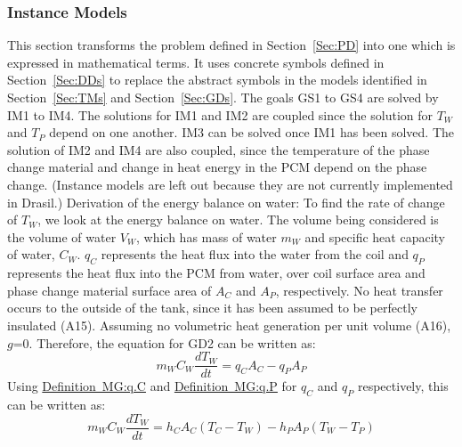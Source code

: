 \documentclass[12pt]{article}
\begin{document}
\subsubsection{Instance Models}
\label{Sec:IMs}
This section transforms the problem defined in Section~\ref{Sec:PD} into one which is expressed in mathematical terms. It uses concrete symbols defined in Section~\ref{Sec:DDs} to replace the abstract symbols in the models identified in Section~\ref{Sec:TMs} and Section~\ref{Sec:GDs}.
The goals GS1 to GS4 are solved by IM1 to IM4. The solutions for IM1 and IM2 are coupled since the solution for $T_{W}$ and $T_{P}$ depend on one another. IM3 can be solved once IM1 has been solved. The solution of IM2 and IM4 are also coupled, since the temperature of the phase change material and change in heat energy in the PCM depend on the phase change. (Instance models are left out because they are not currently implemented in Drasil.)
Derivation of the energy balance on water:
To find the rate of change of $T_{W}$, we look at the energy balance on water. The volume being considered is the volume of water $V_{W}$, which has mass of water $m_{W}$ and specific heat capacity of water, $C_{W}$. $q_{C}$ represents the heat flux into the water from the coil and $q_{P}$ represents the heat flux into the PCM from water, over coil surface area and phase change material surface area of $A_{C}$ and $A_{P}$, respectively. No heat transfer occurs to the outside of the tank, since it has been assumed to be perfectly insulated (A15). Assuming no volumetric heat generation per unit volume (A16), $g$=0. Therefore, the equation for GD2 can be written as:
\begin{equation}
m_{W}C_{W}\frac{dT_{W}}{dt}=q_{C}A_{C}-q_{P}A_{P}
\end{equation}
Using \hyperref[MG:q.C]{Definition~MG:q.C} and \hyperref[MG:q.P]{Definition~MG:q.P} for $q_{C}$ and $q_{P}$ respectively, this can be written as:
\begin{equation}
m_{W}C_{W}\frac{dT_{W}}{dt}=h_{C}A_{C}(T_{C}-T_{W})-h_{P}A_{P}(T_{W}-T_{P})
\end{equation}
\end{document}
